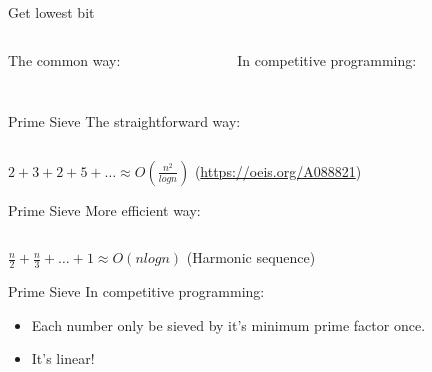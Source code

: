 \begin{frame}{Get lowest bit}
\begin{columns}
  \begin{column}{0.5\columnwidth}
   The common way:
  \inputminted[linenos=true, fontsize=\small, bgcolor=mygray, ]{python}{./src/lowb0.py}
  \end{column}
  \begin{column}{0.5\columnwidth}
     In competitive programming:
    \inputminted[linenos=true, fontsize=\small, bgcolor=mygray, ]{python}{./src/lowb.py}
  \end{column}
\end{columns}
\end{frame}

\begin{frame}{Prime Sieve}
 The straightforward way:
\inputminted[linenos=true, fontsize=\scriptsize, bgcolor=mygray, ]{python}{./src/prime0.py}
   \small $2+3+2+5+\ldots \approx O(\frac{n^2}{log n})$ (\url{https://oeis.org/A088821})
\end{frame}

\begin{frame}{Prime Sieve}
 More efficient way:
\inputminted[linenos=true, fontsize=\scriptsize, bgcolor=mygray, ]{python}{./src/prime1.py}
   \small $\frac{n}{2} + \frac{n}{3} + \ldots + 1 \approx O(nlogn)$ (Harmonic sequence)
\end{frame}

\begin{frame}{Prime Sieve}
   In competitive programming:
  \begin{itemize}
    \item<2-> \small Each number only be sieved by it's minimum prime factor once.
    \item<3-> \small It's linear!
  \end{itemize}
  \inputminted[linenos=true, fontsize=\scriptsize, bgcolor=mygray, ]{python}{./src/prime2.py}
\end{frame}


